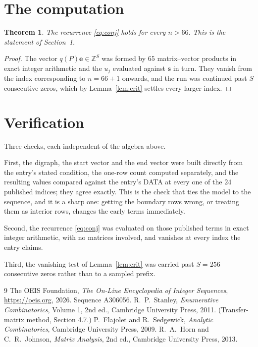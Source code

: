 \documentclass[11pt,a4paper]{article}
\theoremstyle{plain}
\newtheorem{theorem}{Theorem}
\theoremstyle{definition}
\begin{document}
\section{The computation}

\begin{theorem}
The recurrence \eqref{eq:conj} holds for every $n>66$. This is the statement of
Section~1.
\end{theorem}

\begin{proof}
The vector $q(P)\mathbf{e}\in\mathbb{Z}^{S}$ was formed by $65$ matrix--vector
products in exact integer arithmetic and the $u_j$ evaluated against $\mathbf{s}$ in turn.
They vanish from the index corresponding to $n=66+1$ onwards, and the run was continued
past $S$ consecutive zeros, which by Lemma~\ref{lem:crit} settles every larger index.
\end{proof}

\section{Verification}

Three checks, each independent of the algebra above.

First, the digraph, the start vector and the end vector were built directly from the
entry's stated condition, the one-row count computed separately, and the resulting values
compared against the entry's DATA at every one of the $24$ published indices; they
agree exactly. This is the check that ties the model to the sequence, and it is a sharp one:
getting the boundary rows wrong, or treating them as interior rows, changes the early terms
immediately.

Second, the recurrence \eqref{eq:conj} was evaluated on those published terms in exact
integer arithmetic, with no matrices involved, and vanishes at every index the entry claims.

Third, the vanishing test of Lemma~\ref{lem:crit} was carried past $S=256$ consecutive
zeros rather than to a sampled prefix.

\begin{thebibliography}{9}
 The OEIS Foundation, \emph{The On-Line Encyclopedia of Integer
Sequences}, \url{https://oeis.org}, 2026. Sequence A306056.
 R.~P.~Stanley, \emph{Enumerative Combinatorics}, Volume 1, 2nd ed.,
Cambridge University Press, 2011. (Transfer-matrix method, Section 4.7.)
 P.~Flajolet and R.~Sedgewick, \emph{Analytic Combinatorics}, Cambridge
University Press, 2009.
 R.~A.~Horn and C.~R.~Johnson, \emph{Matrix Analysis}, 2nd ed., Cambridge
University Press, 2013.
\end{thebibliography}
\end{document}
